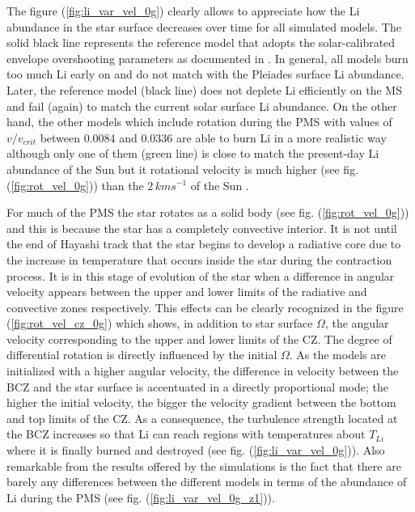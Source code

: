 \documentclass[fleqn,usenatbib]{mnras}
\begin{document}
The figure (\ref{fig:li_var_vel_0g}) clearly allows to appreciate how the Li abundance in the star surface decreases over time for all simulated models. The solid black line represents the reference model that adopts the solar-calibrated envelope overshooting parameters as documented in \citet{Choi2016}. In general, all models burn too much Li early on and do not match with the Pleiades surface Li abundance. Later, the reference model (black line) does not deplete Li efficiently on the MS and fail (again) to match the current solar surface Li abundance. On the other hand, the other models which include rotation during the PMS with values of $v/v_{crit}$ between 0.0084 and 0.0336 are able to burn Li in a more realistic way although only one of them (green line) is close to match the present-day Li abundance of the Sun but it rotational velocity is much higher (see fig. (\ref{fig:rot_vel_0g})) than the $2\,kms^{-1}$ of the Sun \citep{Gill2012}. \par

For much of the PMS the star rotates as a solid body (see fig. (\ref{fig:rot_vel_0g})) and this is because the star has a completely convective interior. It is not until the end of Hayashi track that the star begins to develop a radiative core due to the increase in temperature that occurs inside the star during the contraction process. It is in this stage of evolution of the star when a difference in angular velocity appears between the upper and lower limits of the radiative and convective zones respectively. This effects can be clearly recognized in the figure (\ref{fig:rot_vel_cz_0g}) which shows, in addition to star surface $\Omega$, the angular velocity corresponding to the upper and lower limits of the CZ. The degree of differential rotation is directly influenced by the initial $\Omega$. As the models are initialized with a higher angular velocity, the difference in velocity between the BCZ and the star surface is accentuated in a directly proportional mode; the higher the initial velocity, the bigger the velocity gradient between the bottom and top limits of the CZ. As a consequence, the turbulence strength located at the BCZ increases so that Li can reach regions with temperatures about $T_{Li}$ where it is finally burned and destroyed (see fig. (\ref{fig:li_var_vel_0g})). Also remarkable from the results offered by the simulations is the fact that there are barely any differences between the different models in terms of the abundance of Li during the PMS (see fig. (\ref{fig:li_var_vel_0g_z1})).\par
\end{document}
